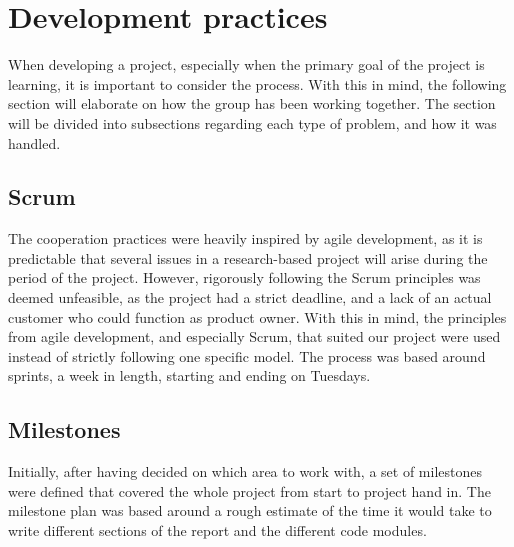\section{Development practices}
When developing a project, especially when the primary goal of the project is learning, it is important to consider the process.
With this in mind, the following section will elaborate on how the group has been working together.
The section will be divided into subsections regarding each type of problem, and how it was handled.

\subsection{Scrum}
The cooperation practices were heavily inspired by agile development, as it is predictable that several issues in a research-based project will arise during the period of the project.
However, rigorously following the Scrum principles was deemed unfeasible, as the project had a strict deadline, and a lack of an actual customer who could function as product owner.
With this in mind, the principles from agile development, and especially Scrum, that suited our project were used instead of strictly following one specific model.
The process was based around sprints, a week in length, starting and ending on Tuesdays.

\subsection{Milestones}
Initially, after having decided on which area to work with, a set of milestones were defined that covered the whole project from start to project hand in.
The milestone plan was based around a rough estimate of the time it would take to write different sections of the report and the different code modules.

